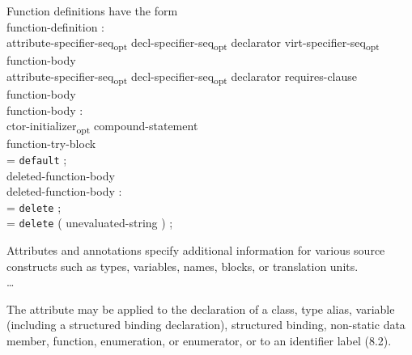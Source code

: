 \begin{modification}
Function definitions have the form\\

function-definition :\\
\tabto{1em}attribute-specifier-seq\textsubscript{opt} decl-specifier-seq\textsubscript{opt} declarator
virt-specifier-seq\textsubscript{opt}\\
\tabto{2em} function-body\\
\tabto{1em}attribute-specifier-seq\textsubscript{opt} decl-specifier-seq\textsubscript{opt} declarator
requires-clause\\
\tabto{2em} function-body\\

function-body :\\
\tabto{1em}ctor-initializer\textsubscript{opt} compound-statement\\
\tabto{1em}function-try-block\\
\tabto{1em}= \texttt{default} ;\\
\tabto{1em}deleted-function-body\\

deleted-function-body :\\
\tabto{1em}= \texttt{delete} ;\\
\tabto{1em}= \texttt{delete} ( unevaluated-string ) ;\\
\end{modification}

\begin{removal}
\end{removal}

\begin{modification}
Attributes and annotations specify additional information for various source constructs such as types, variables,
names,  blocks, or translation units.\\

\ldots
\end{modification}

\begin{modification}
The attribute may be applied to the declaration of a class, type alias, 
variable (including a structured binding
declaration), structured binding,  
non-static data member, function, enumeration, or
enumerator, or to an identifier label (8.2).
\end{modification}

